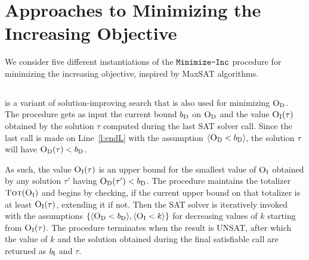 \section{Approaches to Minimizing the Increasing Objective\label{sec:variants}}

We consider five different instantiations of the $\texttt{Minimize-\allowbreak{}Inc}$ procedure for minimizing the increasing objective, inspired by MaxSAT algorithms. 

\subsection{\satunsat{}\label{sec:sat-unsat}}

\satunsat{} is a variant of solution-improving search that is also used for minimizing $\textsc{O}_{\text{D}}$. 
The procedure gets as input the current bound $b_{\text{D}}$ on $\textsc{O}_{\text{D}}$ and 
the value $\textsc{O}_{\text{I}}(\tau)$ obtained by the solution $\tau$ computed during the last SAT solver call. 
Since the last call is made on Line~\ref{l:endL} with the assumption $\langle \textsc{O}_{\text{D}} < b_{\text{D}} \rangle$, the solution $\tau$ will have $\textsc{O}_{\text{D}}(\tau) < b_{\text{D}}$. 

As such, the value  $\textsc{O}_{\text{I}}(\tau)$ is an upper bound for the smallest value of $\textsc{O}_{\text{I}}$ obtained by any solution $\tau'$ having $\textsc{O}_{\text{D}}(\tau') < b_{\text{D}}$.
The procedure \satunsat{} maintains the totalizer $\textsc{Tot}(\textsc{O}_{\text{I}})$ and begins by checking, if the current upper bound on that totalizer is at least $\textsc{O}_{\text{I}}(\tau)$, extending it if not. 
Then the SAT solver is iteratively invoked with the assumptions $\{\langle \textsc{O}_{\text{D}} < b_{\text{D}} \rangle, \langle \textsc{O}_{\text{I}} < k \rangle\}$ for decreasing values of $k$ starting from $\textsc{O}_{\text{I}}(\tau)$.
The procedure terminates when the result is UNSAT, after which the value of $k$ and the solution obtained during the final satisfiable call are returned as $b_{\text{I}}$ and $\tau$.  

